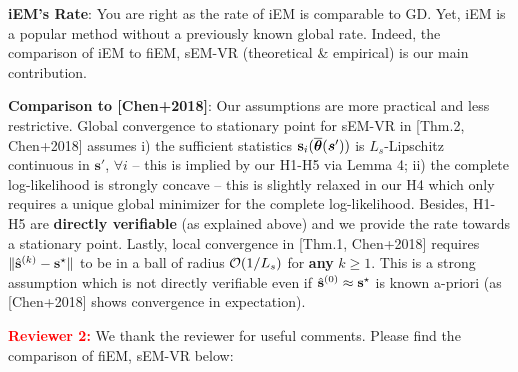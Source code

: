 \documentclass{article}
\begin{document}
\textbf{iEM's Rate}: You are right as the rate of iEM is comparable to GD. Yet, iEM is a popular method without a previously known global rate. Indeed, the  comparison of iEM to fiEM, sEM-VR (theoretical \& empirical) is our main contribution.


\textbf{Comparison to [Chen+2018]}:
Our assumptions are more practical and less restrictive.
Global convergence to stationary point for sEM-VR in [Thm.2, Chen+2018] assumes i) the sufficient statistics ${\bf s}_i( \overline{\bm{\theta}} ( {\bm s}' ) )$ is $L_s$-Lipschitz continuous in ${\bm s}'$,  $\forall i$ -- this is implied by our H1-H5 via Lemma 4; ii) the complete log-likelihood is strongly concave -- this is slightly relaxed in our H4 which only requires a unique global minimizer for the complete log-likelihood.
Besides, H1-H5 are \textbf{directly verifiable} (as explained above) and we provide the rate towards a stationary point.
Lastly, local convergence in [Thm.1, Chen+2018] requires $\| \hat{\bf s}^{(k)} - {\bf s}^\star\|$ to be in a ball of radius ${\cal O}(1/L_s)$ for \textbf{any} $k\geq1$. This is a strong assumption which is not directly verifiable even if $\hat{\bf s}^{(0)} \approx {\bf s}^\star$ is known a-priori (as [Chen+2018] shows convergence in expectation).

\textbf{\textcolor{red}{Reviewer 2:}} We thank the reviewer for useful comments. Please find the comparison of fiEM, sEM-VR below:
\end{document}
